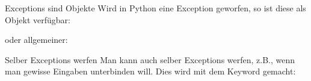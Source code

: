 \begin{frame}{Exceptions sind Objekte}
	Wird in Python eine Exception geworfen, so ist diese als Objekt verfügbar:
	
	oder allgemeiner:
	
\end{frame}

\begin{frame}{Selber Exceptions werfen}
	Man kann auch selber Exceptions werfen, z.B., wenn man gewisse Eingaben unterbinden will. Dies wird mit dem Keyword  gemacht:
	
\end{frame}


